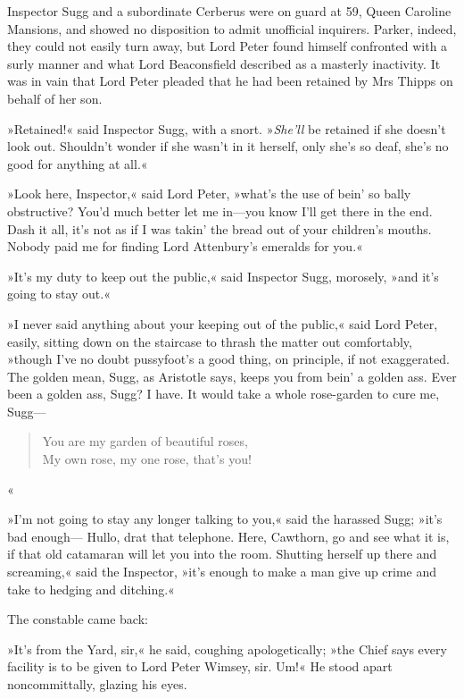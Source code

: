 Inspector Sugg and a subordinate Cerberus were on guard at 59, Queen Caroline Mansions, and showed no disposition to admit unofficial inquirers. Parker, indeed, they could not easily turn away, but Lord Peter found himself confronted with a surly manner and what Lord Beaconsfield described as a masterly inactivity. It was in vain that Lord Peter pleaded that he had been retained by Mrs Thipps on behalf of her son.

»Retained!« said Inspector Sugg, with a snort. »\textit{She'll} be retained if she doesn't look out. Shouldn't wonder if she wasn't in it herself, only she's so deaf, she's no good for anything at all.«

»Look here, Inspector,« said Lord Peter, »what's the use of bein' so bally obstructive? You'd much better let me in\allowbreak---\allowbreak you know I'll get there in the end. Dash it all, it's not as if I was takin' the bread out of your children's mouths. Nobody paid me for finding Lord Attenbury's emeralds for you.«

»It's my duty to keep out the public,« said Inspector Sugg, morosely, »and it's going to stay out.«

»I never said anything about your keeping out of the public,« said Lord Peter, easily, sitting down on the staircase to thrash the matter out comfortably, »though I've no doubt pussyfoot's a good thing, on principle, if not exaggerated. The golden mean, Sugg, as Aristotle says, keeps you from bein' a golden ass. Ever been a golden ass, Sugg? I have. It would take a whole rose-garden to cure me, Sugg---

\begin{verse}
You are my garden of beautiful roses,\\
My own rose, my one rose, that's you!\\
\end{verse}«

»I'm not going to stay any longer talking to you,« said the harassed Sugg; »it's bad enough--- Hullo, drat that telephone. Here, Cawthorn, go and see what it is, if that old catamaran will let you into the room. Shutting herself up there and screaming,« said the Inspector, »it's enough to make a man give up crime and take to hedging and ditching.«

The constable came back:

»It's from the Yard, sir,« he said, coughing apologetically; »the Chief says every facility is to be given to Lord Peter Wimsey, sir. Um!« He stood apart noncommittally, glazing his eyes.

